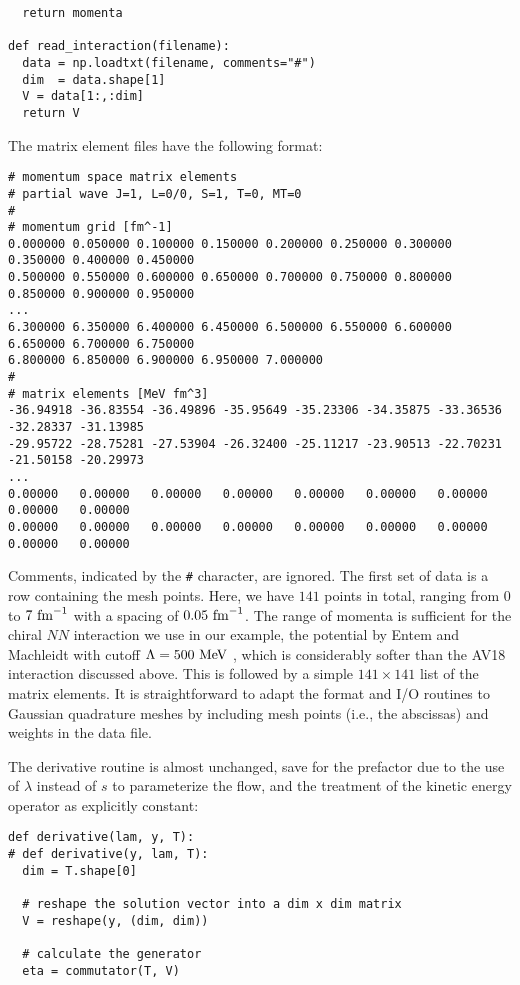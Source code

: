 {\begin{lstlisting}
  return momenta
  
def read_interaction(filename):
  data = np.loadtxt(filename, comments="#")  
  dim  = data.shape[1]
  V = data[1:,:dim]
  return V
\end{lstlisting}

The matrix element files have the following format:
\begin{lstlisting}
# momentum space matrix elements 
# partial wave J=1, L=0/0, S=1, T=0, MT=0 
# 
# momentum grid [fm^-1]
0.000000 0.050000 0.100000 0.150000 0.200000 0.250000 0.300000 0.350000 0.400000 0.450000 
0.500000 0.550000 0.600000 0.650000 0.700000 0.750000 0.800000 0.850000 0.900000 0.950000 
...
6.300000 6.350000 6.400000 6.450000 6.500000 6.550000 6.600000 6.650000 6.700000 6.750000 
6.800000 6.850000 6.900000 6.950000 7.000000 
#
# matrix elements [MeV fm^3] 
-36.94918 -36.83554 -36.49896 -35.95649 -35.23306 -34.35875 -33.36536 -32.28337 -31.13985 
-29.95722 -28.75281 -27.53904 -26.32400 -25.11217 -23.90513 -22.70231 -21.50158 -20.29973 
...
0.00000   0.00000   0.00000   0.00000   0.00000   0.00000   0.00000   0.00000   0.00000   
0.00000   0.00000   0.00000   0.00000   0.00000   0.00000   0.00000   0.00000   0.00000
\end{lstlisting}
Comments, indicated by the \texttt{\#} character, are ignored. The first set
of data is a row containing the mesh points. Here, we have $141$ points in total,
ranging from $0$ to $7\,\,\text{fm}^{-1}$ with a spacing of $0.05\,\,\text{fm}^{-1}$. The range of momenta
is sufficient for the chiral $NN$ interaction we use in our example, the \NNNLO{} 
potential by Entem and Machleidt with cutoff $\Lambda=500\,\,\text{MeV}$ \cite{Entem:2003th,Machleidt:2011bh}, 
which is considerably softer than the AV18 interaction discussed above. This is followed
by a simple $141 \times 141$ list of the matrix elements. It is straightforward
to adapt the format and I/O routines to Gaussian quadrature meshes by including
mesh points (i.e., the abscissas) and weights in the data file.

The derivative routine is almost unchanged, save for the prefactor due to the
use of $\lambda$ instead of $s$ to parameterize the flow, and the treatment of
the kinetic energy operator as explicitly constant:
\begin{lstlisting}
def derivative(lam, y, T):
# def derivative(y, lam, T):
  dim = T.shape[0]

  # reshape the solution vector into a dim x dim matrix
  V = reshape(y, (dim, dim))

  # calculate the generator
  eta = commutator(T, V)


\end{lstlisting}}
